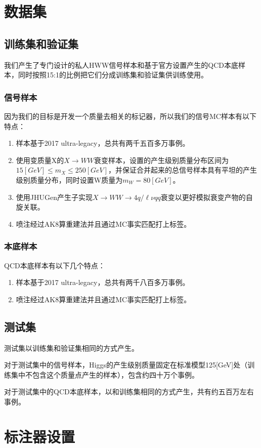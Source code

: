 \section{数据集}
\subsection{训练集和验证集}
我们产生了专门设计的私人HWW信号样本和基于官方设置产生的QCD本底样本，同时按照15:1的比例把它们分成训练集和验证集供训练使用。
\subsubsection{信号样本}
因为我们的目标是开发一个质量去相关的标记器，所以我们的信号MC样本有以下特点：
\begin{enumerate}
    \item 样本基于2017 ultra-legacy，总共有两千五百多万事例。
    \item 使用变质量X的$X\to WW$衰变样本，设置的产生级别质量分布区间为$15 [\si{GeV}]\leq m_X\leq 250[\si{GeV}]$，并保证合并起来的总信号样本具有平坦的产生级别质量分布，同时设置W质量为$m_W=80[\si{GeV}]$。
    \item 使用JHUGen产生子实现$X\to WW\to4q/\ell \nu qq$衰变以更好模拟衰变产物的自旋关联。
    \item 喷注经过AK8算重建法并且通过MC事实匹配打上标签。
\end{enumerate}

\subsubsection{本底样本}
QCD本底样本有以下几个特点：
\begin{enumerate}
    \item 样本基于2017 ultra-legacy，总共有两千八百多万事例。
    \item 喷注经过AK8算重建法并且通过MC事实匹配打上标签。
\end{enumerate}
\subsection{测试集}
测试集以训练集和验证集相同的方式产生。

对于测试集中的信号样本，Higgs的产生级别质量固定在标准模型125[GeV]处（训练集中不包含这个质量点产生的样本），包含约四十万个事例。

对于测试集中的QCD本底样本，以和训练集相同的方式产生，共有约五百万左右事例。


\section{标注器设置}
